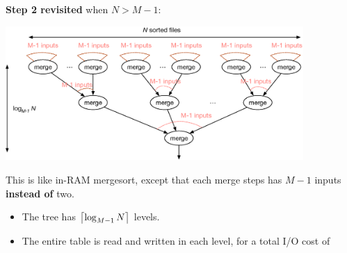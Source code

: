 %
%
\begin{frame}

\textbf{Step 2 revisited} \alert{when $N > M-1$}:

\begin{center}
\includegraphics[width=0.85\textwidth]{figures/mergesort/merge_sort_part2_FULL}
\end{center}

This is like in-RAM mergesort, except that each merge steps has $M-1$ inputs \textbf{instead of} two.
\begin{itemize}[-,noitemsep,topsep=-0.5em]
\item The tree has $\ceil*{\log_{M-1}N}$ levels.
\item The entire table is read and written in each level, for a total I/O cost of 
\end{itemize}
\end{frame}

